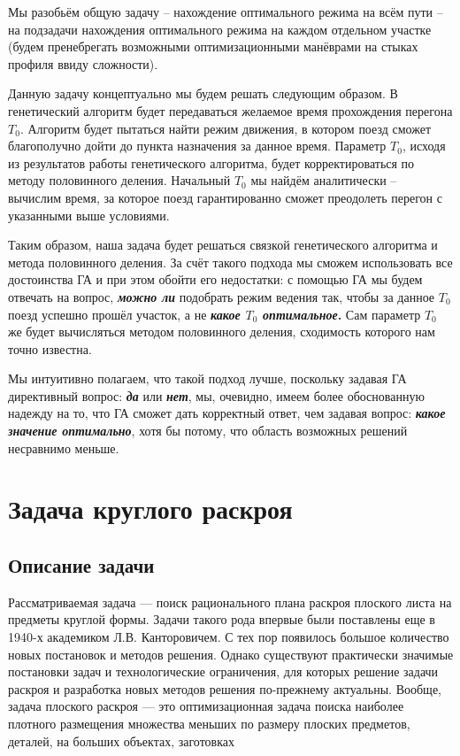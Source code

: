 Мы разобьём общую задачу -- нахождение оптимального режима на всём пути -- на подзадачи нахождения оптимального режима на каждом отдельном участке (будем пренебрегать возможными оптимизационными манёврами на стыках профиля ввиду сложности).

Данную задачу концептуально мы будем решать следующим образом.
В генетический алгоритм будет передаваться желаемое время прохождения перегона $T_0$. Алгоритм будет пытаться найти режим движения, в котором поезд сможет благополучно дойти до пункта назначения за данное время. Параметр $T_0$, исходя из результатов работы генетического алгоритма, будет корректироваться по методу половинного деления. Начальный $T_0$ мы найдём аналитически -- вычислим время, за которое поезд гарантированно сможет преодолеть перегон с указанными выше условиями.

Таким образом, наша задача будет решаться связкой генетического алгоритма и метода половинного деления. За счёт такого подхода мы сможем использовать все достоинства ГА и при этом обойти его недостатки: с помощью ГА мы будем отвечать на вопрос, \textbf{\textit{можно ли}} подобрать режим ведения так, чтобы за данное $T_0$ поезд успешно прошёл участок, а не \textbf{\textit{какое $T_0$ оптимальное}.} Сам параметр $T_0$ же будет вычисляться методом половинного деления, сходимость которого нам точно известна.

Мы интуитивно полагаем, что такой подход лучше, поскольку задавая ГА директивный вопрос: \textbf{\textit{да}} или \textbf{\textit{нет}}, мы, очевидно, имеем более обоснованную надежду на то, что ГА сможет дать корректный ответ, чем задавая вопрос: \textbf{\textit{какое значение оптимально}}, хотя бы потому, что область возможных решений несравнимо меньше.

\section{Задача круглого раскроя}
\subsection{Описание задачи}
Рассматриваемая задача — поиск рационального плана раскроя плоского листа на предметы круглой формы. Задачи такого рода впервые
были поставлены еще в 1940-х академиком Л.В. Канторовичем. С тех пор появилось большое количество новых постановок и методов решения. Однако существуют практически значимые 
постановки задач и технологические ограничения, для которых решение задачи раскроя и
разработка новых методов решения по-прежнему актуальны.
Вообще, задача плоского раскроя — это оптимизационная задача поиска наиболее плотного размещения множества меньших по размеру 
плоских предметов, деталей, на больших объектах, заготовках


